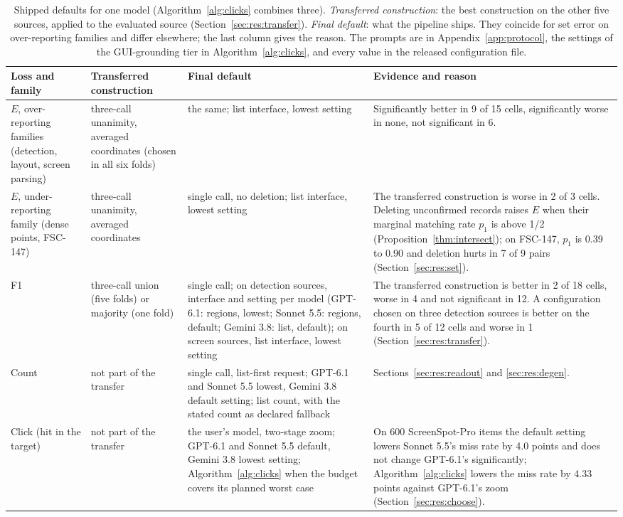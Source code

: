 \begin{table}[tp]
\centering\small\setlength{\tabcolsep}{4pt}
\caption{Shipped defaults for one model (Algorithm~\ref{alg:clicks} combines three). \emph{Transferred construction}: the best construction on the other five sources, applied to the evaluated source (Section~\ref{sec:res:transfer}). \emph{Final default}: what the pipeline ships. They coincide for set error on over-reporting families and differ elsewhere; the last column gives the reason. The prompts are in Appendix~\ref{app:protocol}, the settings of the GUI-grounding tier in Algorithm~\ref{alg:clicks}, and every value in the released configuration file.}\label{tab:defaults}
\begin{tabular}{@{}>{\raggedright\arraybackslash}p{2.7cm}>{\raggedright\arraybackslash}p{3.0cm}>{\raggedright\arraybackslash}p{3.6cm}>{\raggedright\arraybackslash}p{5.7cm}@{}}\toprule
Loss and family & Transferred construction & Final default & Evidence and reason \\\midrule
$E$, over-reporting families (detection, layout, screen parsing) & three-call unanimity, averaged coordinates (chosen in all six folds) & the same; list interface, lowest setting & Significantly better in 9 of 15 cells, significantly worse in none, not significant in 6. \\
$E$, under-reporting family (dense points, FSC-147) & three-call unanimity, averaged coordinates & single call, no deletion; list interface, lowest setting & The transferred construction is worse in 2 of 3 cells. Deleting unconfirmed records raises $E$ when their marginal matching rate $p_1$ is above 1/2 (Proposition~\ref{thm:intersect}); on FSC-147, $p_1$ is 0.39 to 0.90 and deletion hurts in 7 of 9 pairs (Section~\ref{sec:res:set}). \\
F1 & three-call union (five folds) or majority (one fold) & single call; on detection sources, interface and setting per model (GPT-6.1: regions, lowest; Sonnet 5.5: regions, default; Gemini 3.8: list, default); on screen sources, list interface, lowest setting & The transferred construction is better in 2 of 18 cells, worse in 4 and not significant in 12. A configuration chosen on three detection sources is better on the fourth in 5 of 12 cells and worse in 1 (Section~\ref{sec:res:transfer}). \\
Count & not part of the transfer & single call, list-first request; GPT-6.1 and Sonnet 5.5 lowest, Gemini 3.8 default setting; list count, with the stated count as declared fallback & Sections~\ref{sec:res:readout} and \ref{sec:res:degen}. \\
Click (hit in the target) & not part of the transfer & the user's model, two-stage zoom; GPT-6.1 and Sonnet 5.5 default, Gemini 3.8 lowest setting; Algorithm~\ref{alg:clicks} when the budget covers its planned worst case & On 600 ScreenSpot-Pro items the default setting lowers Sonnet 5.5's miss rate by 4.0 points and does not change GPT-6.1's significantly; Algorithm~\ref{alg:clicks} lowers the miss rate by 4.33 points against GPT-6.1's zoom (Section~\ref{sec:res:choose}). \\\bottomrule
\end{tabular}
\end{table}

